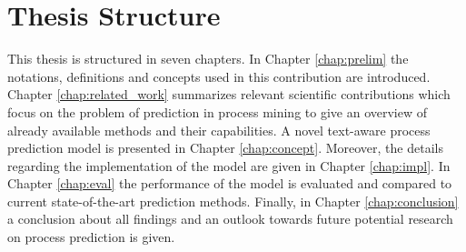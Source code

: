 \section{Thesis Structure}

This thesis is structured in seven chapters.
In Chapter \ref{chap:prelim} the notations, definitions and concepts used in this contribution are introduced.
Chapter \ref{chap:related_work} summarizes relevant scientific contributions which focus on the problem of prediction in process mining to give an overview of already available methods and their capabilities.
A novel text-aware process prediction model is presented in Chapter \ref{chap:concept}.
Moreover, the details regarding the implementation of the model are given in Chapter \ref{chap:impl}.
In Chapter \ref{chap:eval} the performance of the model is evaluated and compared to current state-of-the-art prediction methods.
Finally, in Chapter \ref{chap:conclusion} a conclusion about all findings and an outlook towards future potential research on process prediction is given.